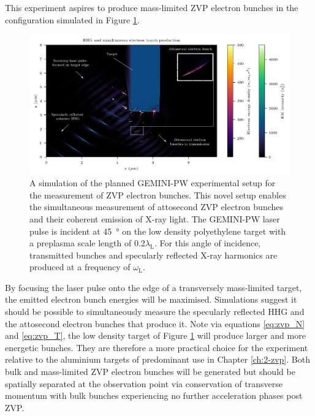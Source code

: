 This experiment aspires to produce mass-limited ZVP electron bunches in the configuration simulated in Figure \ref{fig:experimentsetuphhgbunches2}. %
\begin{figure}
	\centering
	\includegraphics[width=1\linewidth]{figures/zvp/Experiment_setup_HHG_bunches2}
	\caption[Planned GEMINI-PW experimental setup for the measurement of ZVP electron bunches.]{A simulation of the planned GEMINI-PW experimental setup for the measurement of ZVP electron bunches. This novel setup enables the simultaneous measurement of attosecond ZVP electron bunches and their coherent emission of X-ray light. The GEMINI-PW laser pulse is incident at \qty{45}{\degree} on the low density polyethylene target with a preplasma scale length of $0.2\lambda_\mathrm{L}$. For this angle of incidence, transmitted bunches and specularly reflected X-ray harmonics are produced at a frequency of $\omega_\mathrm{L}$.}
	\label{fig:experimentsetuphhgbunches2}
\end{figure}
By focusing the laser pulse onto the edge of a transversely mass-limited target, the emitted electron bunch energies will be maximised. Simulations suggest it should be possible to simultaneously measure the specularly reflected \ac{HHG} and the attosecond electron bunches that produce it. Note via equations \ref{eq:zvp_N} and \ref{eq:zvp_T}, the low density target of Figure \ref{fig:experimentsetuphhgbunches2} will produce larger and more energetic bunches. They are therefore a more practical choice for the experiment relative to the aluminium targets of predominant use in Chapter \ref{ch:2-zvp}. Both bulk and mass-limited ZVP electron bunches will be generated but should be spatially separated at the observation point via conservation of transverse momentum with bulk bunches experiencing no further acceleration phases post ZVP.


